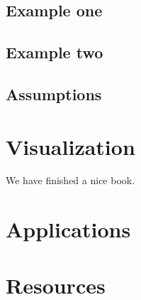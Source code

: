 \documentclass[]{book}
\begin{document}
\section{Example one}\label{example-one}

\section{Example two}\label{example-two}

\section{Assumptions}\label{assumptions}

\chapter{Visualization}\label{visualization}

We have finished a nice book.

\chapter{Applications}\label{applications}

\chapter{Resources}\label{resources}


\end{document}
